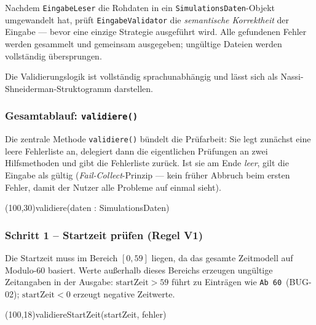 \documentclass[12pt,a4paper]{article}
\begin{document}
Nachdem \texttt{EingabeLeser} die Rohdaten in ein \texttt{SimulationsDaten}-Objekt
umgewandelt hat, prüft \texttt{EingabeValidator} die \emph{semantische Korrektheit}
der Eingabe --- bevor eine einzige Strategie ausgeführt wird.
Alle gefundenen Fehler werden gesammelt und gemeinsam ausgegeben;
ungültige Dateien werden vollständig übersprungen.

Die Validierungslogik ist vollständig sprachunabhängig und lässt sich
als Nassi-Shneiderman-Struktogramm darstellen.

\subsubsection*{Gesamtablauf: \texttt{validiere()}}

Die zentrale Methode \texttt{validiere()} bündelt die Prüfarbeit:
Sie legt zunächst eine leere Fehlerliste an, delegiert dann die
eigentlichen Prüfungen an zwei Hilfsmethoden und gibt die Fehlerliste zurück.
Ist sie am Ende \emph{leer}, gilt die Eingabe als gültig (\emph{Fail-Collect}-Prinzip ---
kein früher Abbruch beim ersten Fehler, damit der Nutzer alle Probleme
auf einmal sieht).

\begin{center}
\begin{struktogramm}(100,30){validiere(daten : SimulationsDaten)}
\end{struktogramm}
\end{center}

\subsubsection*{Schritt 1 -- Startzeit prüfen (Regel V1)}

Die Startzeit muss im Bereich $[0, 59]$ liegen, da das gesamte Zeitmodell
auf Modulo-60 basiert.
Werte außerhalb dieses Bereichs erzeugen ungültige Zeitangaben in der Ausgabe:
$\text{startZeit} > 59$ führt zu Einträgen wie \texttt{Ab 60}~(BUG-02);
$\text{startZeit} < 0$ erzeugt negative Zeitwerte.

\begin{center}
\begin{struktogramm}(100,18){validiereStartZeit(startZeit, fehler)}
  \change
  \ifend
\end{struktogramm}
\end{center}
\end{document}
